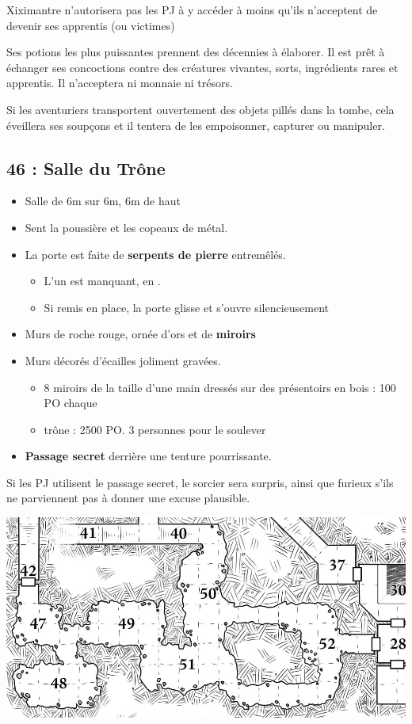 Xiximantre n'autorisera pas les PJ à y accéder à moins qu'ils n'acceptent de devenir ses apprentis (ou victimes)

Ses potions les plus puissantes prennent des décennies à élaborer.
Il est prêt à échanger ses concoctions contre des créatures vivantes, sorts, ingrédients rares et apprentis.
Il n'acceptera ni monnaie ni trésors.

Si les aventuriers transportent ouvertement des objets pillés dans la tombe, cela éveillera ses soupçons et il tentera de les empoisonner, capturer ou manipuler.

\subsection{46 : Salle du Trône}\label{n3:s46}
\begin{itemize}
  \item Salle de 6m sur 6m, 6m de haut
  \item Sent la poussière et les copeaux de métal.
  \item La porte est faite de \textbf{serpents de pierre} entremêlés.
  \begin{itemize}
    \item L'un est manquant, en \textbf{}.
    \item Si remis en place, la porte glisse et s'ouvre silencieusement
  \end{itemize}
  \item Murs de roche rouge, ornée d'ors et de \textbf{miroirs}
  \item Murs décorés d'écailles joliment gravées.
  \begin{itemize}
    \item 8 miroirs de la taille d'une main dressés sur des présentoirs en bois : 100 PO chaque
    \item trône : 2500 PO.  3 personnes pour le soulever
  \end{itemize}
  \item \textbf{Passage secret} derrière une tenture pourrissante.
\end{itemize}

Si les PJ utilisent le passage secret, le sorcier sera surpris, ainsi que furieux s'ils ne parviennent pas à donner une excuse plausible.

\vfill\pagebreak
\ifmulticolEnd
\begin{center}
  \includegraphics[width=\linewidth]{pics/map_47-52.jpg}
\end{center}
\ifmulticolStart

